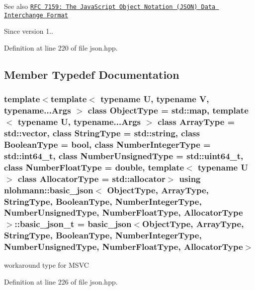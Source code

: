 \begin{DoxySeeAlso}{See also}
\href{http://rfc7159.net/rfc7159}{\tt R\+F\+C 7159\+: The Java\+Script Object Notation (J\+S\+O\+N) Data Interchange Format}
\end{DoxySeeAlso}
\begin{DoxySince}{Since}
version 1.. 
\end{DoxySince}


Definition at line 220 of file json.\+hpp.



\subsection{Member Typedef Documentation}
\hypertarget{classnlohmann_1_1basic__json_a3e59ba94923629542aa2a914f0bc2eec}{}
\subsubsection[{basic\+\_\+json\+\_\+t}]{\setlength{\rightskip}{0pt plus 5cm}template$<$template$<$ typename U, typename V, typename...\+Args $>$ class Object\+Type = std\+::map, template$<$ typename U, typename...\+Args $>$ class Array\+Type = std\+::vector, class String\+Type  = std\+::string, class Boolean\+Type  = bool, class Number\+Integer\+Type  = std\+::int64\+\_\+t, class Number\+Unsigned\+Type  = std\+::uint64\+\_\+t, class Number\+Float\+Type  = double, template$<$ typename U $>$ class Allocator\+Type = std\+::allocator$>$ using {\bf nlohmann\+::basic\+\_\+json}$<$ Object\+Type, Array\+Type, String\+Type, Boolean\+Type, Number\+Integer\+Type, Number\+Unsigned\+Type, Number\+Float\+Type, Allocator\+Type $>$\+::{\bf basic\+\_\+json\+\_\+t} =  {\bf basic\+\_\+json}$<$Object\+Type, Array\+Type, String\+Type, Boolean\+Type, Number\+Integer\+Type, Number\+Unsigned\+Type, Number\+Float\+Type, Allocator\+Type$>$\hspace{0.3cm}{\ttfamily [private]}}\label{classnlohmann_1_1basic__json_a3e59ba94923629542aa2a914f0bc2eec}


workaround type for M\+S\+V\+C 



Definition at line 226 of file json.\+hpp.

\hypertarget{classnlohmann_1_1basic__json_ac8d45b57874b4a6e9c07f7d3b5daa1f9}{}
